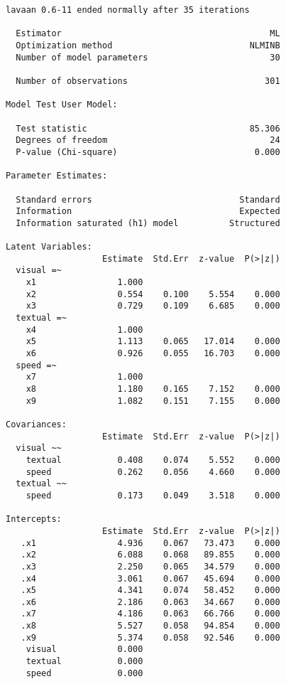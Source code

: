\begin{verbatim}
lavaan 0.6-11 ended normally after 35 iterations

  Estimator                                         ML
  Optimization method                           NLMINB
  Number of model parameters                        30
                                                      
  Number of observations                           301
                                                      
Model Test User Model:
                                                      
  Test statistic                                85.306
  Degrees of freedom                                24
  P-value (Chi-square)                           0.000

Parameter Estimates:

  Standard errors                             Standard
  Information                                 Expected
  Information saturated (h1) model          Structured

Latent Variables:
                   Estimate  Std.Err  z-value  P(>|z|)
  visual =~                                           
    x1                1.000                           
    x2                0.554    0.100    5.554    0.000
    x3                0.729    0.109    6.685    0.000
  textual =~                                          
    x4                1.000                           
    x5                1.113    0.065   17.014    0.000
    x6                0.926    0.055   16.703    0.000
  speed =~                                            
    x7                1.000                           
    x8                1.180    0.165    7.152    0.000
    x9                1.082    0.151    7.155    0.000

Covariances:
                   Estimate  Std.Err  z-value  P(>|z|)
  visual ~~                                           
    textual           0.408    0.074    5.552    0.000
    speed             0.262    0.056    4.660    0.000
  textual ~~                                          
    speed             0.173    0.049    3.518    0.000

Intercepts:
                   Estimate  Std.Err  z-value  P(>|z|)
   .x1                4.936    0.067   73.473    0.000
   .x2                6.088    0.068   89.855    0.000
   .x3                2.250    0.065   34.579    0.000
   .x4                3.061    0.067   45.694    0.000
   .x5                4.341    0.074   58.452    0.000
   .x6                2.186    0.063   34.667    0.000
   .x7                4.186    0.063   66.766    0.000
   .x8                5.527    0.058   94.854    0.000
   .x9                5.374    0.058   92.546    0.000
    visual            0.000                           
    textual           0.000                           
    speed             0.000                           


\end{verbatim}
